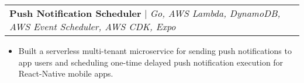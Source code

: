 \documentclass[letterpaper,11pt]{article}
\makeatletter
\newcommand{\resumeItem}[1]{
  \item\small{
    {#1 \vspace{-2pt}}
  }
}
\newcommand{\resumeProjectHeading}[2]{
    \item
    \begin{tabular*}{0.97\textwidth}{l@{\extracolsep{\fill}}r}
      \small#1 & #2 \\
    \end{tabular*}\vspace{-7pt}
}
\newcommand{\resumeItemListStart}{\begin{itemize}}
\newcommand{\resumeItemListEnd}{\end{itemize}\vspace{-5pt}}
\makeatother
\begin{document}


        \resumeProjectHeading
          {\textbf{Push Notification Scheduler} $|$ \emph{Go, AWS Lambda, DynamoDB, AWS Event Scheduler, AWS CDK, Expo}}{}
          \resumeItemListStart
          \resumeItem{Built a serverless multi-tenant microservice for sending push notifications to app users and scheduling one-time delayed push notification execution for React-Native mobile apps.}
          \resumeItemListEnd



        
\end{document}

